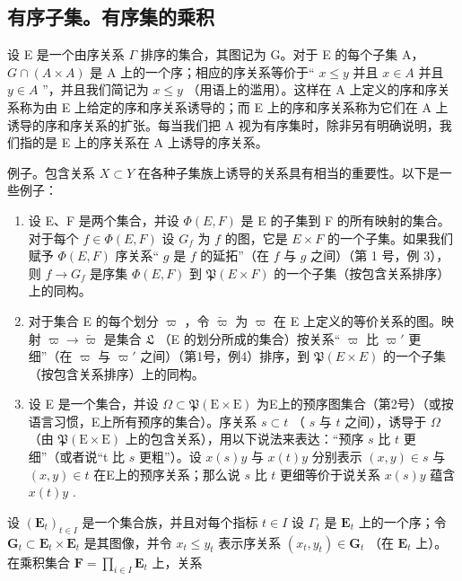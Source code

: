 \subsection{有序子集。有序集的乘积}

设 E 是一个由序关系 \(\Gamma\) 排序的集合，其图记为 G。对于 E 的每个子集 A， \(G \cap (A \times A)\) 是 A 上的一个序；相应的序关系等价于“ \(x \leqslant y\) 并且 \(x \in A\) 并且 \(y \in A\) ”，并且我们简记为 \(x \leqslant y\) （用语上的滥用）。这样在 A 上定义的序和序关系称为由 E 上给定的序和序关系诱导的；而 E 上的序和序关系称为它们在 A 上诱导的序和序关系的扩张。每当我们把 A 视为有序集时，除非另有明确说明，我们指的是 E 上的序关系在 A 上诱导的序关系。

例子。包含关系 \(X \subset Y\) 在各种子集族上诱导的关系具有相当的重要性。以下是一些例子：

\begin{enumerate}
\def\labelenumi{(\arabic{enumi})}
\item
  设 E、F 是两个集合，并设 \(\Phi(E, F)\) 是 E 的子集到 F 的所有映射的集合。对于每个 \(f \in \Phi(E, F)\) 设 \(G_f\) 为 \(f\) 的图，它是 \(E \times F\) 的一个子集。如果我们赋予 \(\Phi(E, F)\) 序关系“ \(g\) 是 \(f\) 的延拓”（在 \(f\) 与 \(g\) 之间）（第 1 号，例 3），则 \(f \to G_f\) 是序集 \(\Phi(E, F)\) 到 \(\mathfrak{P}(E \times F)\) 的一个子集（按包含关系排序）上的同构。
\item
  对于集合 E 的每个划分 \(\varpi\) ，令 \(\tilde{\varpi}\) 为 \(\varpi\) 在 E 上定义的等价关系的图。映射 \(\varpi \to \tilde{\varpi}\) 是集合 \(\mathfrak{L}\) （E 的划分所成的集合）按关系“ \(\varpi\) 比 \(\varpi'\) 更细”（在 \(\varpi\) 与 \(\varpi'\) 之间）（第1号，例4）排序，到 \(\mathfrak{P}(E \times E)\) 的一个子集（按包含关系排序）上的同构。
\item
  设 E 是一个集合，并设 \(\Omega \subset \mathfrak{P}(\mathrm{E} \times \mathrm{E})\) 为E上的预序图集合（第2号）（或按语言习惯，E上所有预序的集合）。序关系 \(s \subset t\) （ \(s\) 与 \(t\) 之间），诱导于 \(\Omega\) （由 \(\mathfrak{P}(\mathrm{E} \times \mathrm{E})\) 上的包含关系），用以下说法来表达：“预序 \(s\) 比 \(t\) 更细”（或者说“t 比 \(s\) 更粗”）。设 \(x(s)y\) 与 \(x(t)y\) 分别表示 \((x,y) \in s\) 与 \((x,y) \in t\) 在E上的预序关系；那么说 \(s\) 比 \(t\) 更细等价于说关系 \(x(s)y\) 蕴含 \(x(t)y\) .
\end{enumerate}

设 \((\mathbf{E}_t)_{t \in I}\) 是一个集合族，并且对每个指标 \(t \in I\) 设 \(\Gamma_t\) 是 \(\mathbf{E}_t\) 上的一个序；令 \(\mathbf{G}_t \subset \mathbf{E}_t \times \mathbf{E}_t\) 是其图像，并令 \(x_t \leqslant y_t\) 表示序关系 \((x_t, y_t) \in \mathbf{G}_t\) （在 \(\mathbf{E}_t\) 上）。在乘积集合 \(\mathbf{F} = \prod_{i \in I} \mathbf{E}_t\) 上，关系

